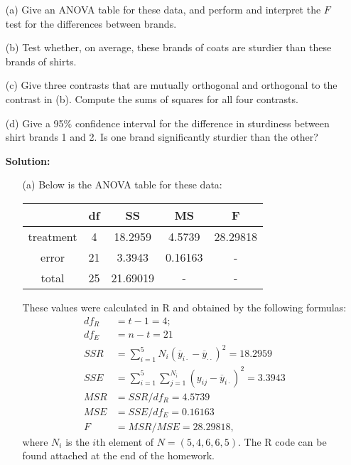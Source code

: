\documentclass[11pt]{article}
\begin{document}
\begin{itemize}
\item[(a)]  Give an ANOVA table for these data, and perform and interpret the $F$ test for the differences between brands.
\item[(b)]  Test whether, on average, these brands of coats are sturdier than these brands of shirts.
\item[(c)] Give three contrasts that are mutually orthogonal and orthogonal to the contrast in (b).  Compute the sums of squares for all four contrasts.
\item[(d)]  Give a 95$\%$ confidence interval for the difference in sturdiness between shirt brands 1 and 2.  Is one brand significantly sturdier than the other?
\end{itemize}
\begin{itemize}
\item[] {\bf Solution:}
\begin{itemize}
\item[(a)] Below is the ANOVA table for these data:
\begin{center}
\begin{tabular}{|c||c||c||c||c|}
\hline
\hspace{3mm}{\bf Source}\hspace{2mm} & {\bf df} & {\bf SS} & {\bf MS} & {\bf F} \\
\hline
\hline
treatment & 4 & 18.2959 & 4.5739 & 28.29818 \\
error & 21 & 3.3943 & 0.16163 & - \\
\hline
total & 25 & 21.69019 & - & - \\
\hline
\end{tabular}
\end{center}
These values were calculated in R and obtained by the following formulas:
\begin{align*}
df_R &= t - 1 = 4; \\
df_E &= n - t = 21 \\
SSR &= \sum_{i=1}^5 N_i(\overline{y}_{i\cdot} - \overline{y}_{\cdot\cdot})^2 = 18.2959 \\
SSE &= \sum_{i=1}^5\sum_{j=1}^{N_i} (y_{ij} - \overline{y}_{i\cdot})^2 = 3.3943 \\
MSR &= SSR / df_R = 4.5739 \\
MSE &= SSE / df_E = 0.16163 \\
F &= MSR / MSE = 28.29818,
\end{align*}
where $N_i$ is the $i$th element of $N = (5, 4, 6, 6, 5)$.  The R code can be found attached at the end of the homework.

\end{itemize}
\end{itemize}
\end{document}
